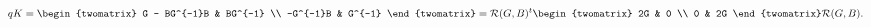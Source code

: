 \begin{equation}
\label{eq:qKdiag}
  qK = \begin{twomatrix}
         G - BG^{-1}B & BG^{-1} \\
           -G^{-1}B   &  G^{-1}  
       \end{twomatrix}
     = \mathcal{R}(G,B)^t \begin{twomatrix} 2G & 0 \\ 0 & 2G \end{twomatrix}
       \mathcal{R}(G,B).
\end{equation}


